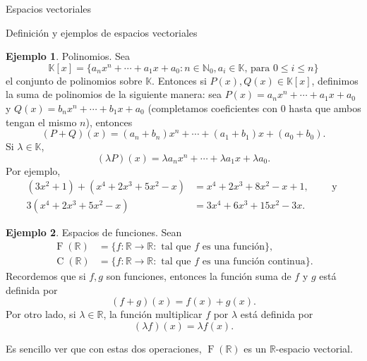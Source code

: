 \documentclass[a4paper,12pt,twoside,spanish]{amsbook}
\theoremstyle{definition}
\newtheorem{ejemplo}{Ejemplo}[section]
\theoremstyle{remark}
\newcommand{\R}{\mathbb R}
\newcommand{\K}{\mathbb K}
\begin{document}
\begin{chapter}{Espacios vectoriales}
\begin{section}{Definición y ejemplos de espacios vectoriales}
			\begin{ejemplo}{\sc Polinomios.} Sea 
				\begin{equation*}
				\K[x] = \{a_nx^n + \cdots + a_1x + a_0: n \in \mathbb N_0, a_i \in \K\text{, para } 0\le i \le n  \}
				\end{equation*}
				el conjunto de polinomios sobre $\K$. Entonces si $P(x), Q(x) \in \K[x]$, definimos la suma de polinomios de la siguiente manera: sea $P(x) = a_nx^n + \cdots + a_1x + a_0$ y $Q(x)= b_nx^n + \cdots + b_1x + a_0$ (completamos coeficientes con 0 hasta que ambos tengan el mismo $n$), entonces
				\begin{equation*}
				(P+Q)(x) = (a_n+b_n)x^n + \cdots + (a_1+ b_1)x + (a_0+b_0).
				\end{equation*}
				Si $\lambda \in \K$, 
				\begin{equation*}
				(\lambda P)(x) = \lambda a_nx^n + \cdots + \lambda a_1x + \lambda a_0.
				\end{equation*}
				Por ejemplo,
				\begin{align*}
				(3x^2 + 1)+(x^4 + 2x^3 + 5x^2-x) &= x^4 + 2x^3 + 8x^2-x +1, \qquad \text{ y } \\
				3(x^4 + 2x^3 + 5x^2-x) &= 3x^4 + 6x^3 + 15x^2-3x.
				\end{align*}
			\end{ejemplo}
			
			
			\medspace
			
			\begin{ejemplo}{\sc Espacios de funciones.} Sean
				\begin{align*}
				\operatorname{F}(\R) &= \{f: \R \to \R: \text{ tal que } f \text{ es una función} \},\\
				\operatorname{C}(\R) &= \{f: \R \to \R: \text{ tal que }  f  \text{ es una función continua} \}.
				\end{align*}
				Recordemos que si $f,g$ son funciones, entonces la función suma de $f$ y $g$ está definida por
				\begin{equation*}
				(f+g)(x) = f(x) + g(x).
				\end{equation*}
				Por otro lado, si $\lambda \in \R$, la función multiplicar $f$ por $\lambda $ está definida por
				\begin{equation*}
				(\lambda f)(x) = \lambda f(x).
				\end{equation*}			
								
				Es sencillo ver que con estas dos operaciones, $\operatorname{F}(\R)$ es un $\R$-espacio vectorial.
				

\end{ejemplo}
\end{section}
\end{chapter}
\end{document}
